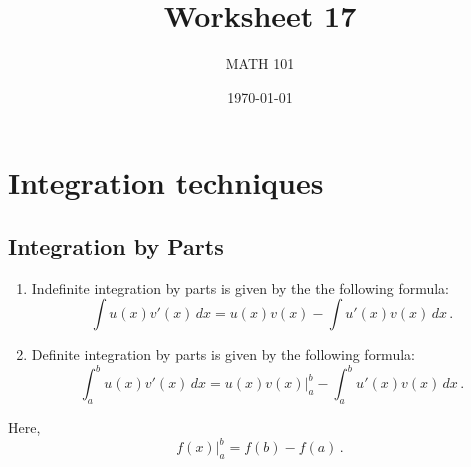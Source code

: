 \documentclass[12pt]{amsart}
\title{ Worksheet 17}
\author{MATH 101}
\date{\today}
\begin{document}
\maketitle

\section*{Integration techniques}

\subsection*{Integration by Parts}

\begin{enumerate}
	\item Indefinite integration by parts is given by the the following formula:
	      \begin{equation*}
		      \int u(x)v'(x) \, dx = u(x)v(x) - \int u'(x) v(x) \, dx \,.
	      \end{equation*}

	\item Definite integration by parts is given by the following formula:
	      \begin{equation*}
		      \int_a^b u(x)v'(x) \, dx = u(x)v(x)\big\rvert_a^b  - \int_a^b u'(x) v(x) \, dx \,.
	      \end{equation*}
\end{enumerate}
Here,
\begin{equation*}
	f(x) \big\rvert_a^b = f(b) - f(a) \,.
\end{equation*}
\end{document}

